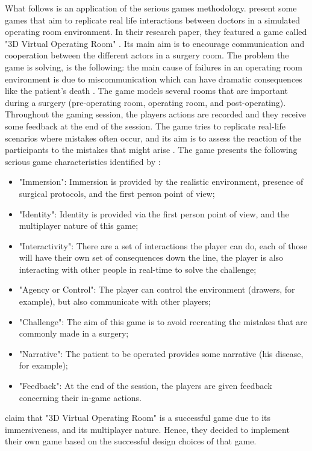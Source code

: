 \documentclass{l4proj}
\begin{document}
What follows is an application of the serious games methodology. \citet{panzoli_interaction_2017} present some games that aim to replicate real life interactions between doctors
in a simulated operating room environment. In their research paper, they featured a game called "3D Virtual Operating Room" \citep{panzoli_interaction_2017}.
Its main aim is to encourage communication and cooperation between the different actors in a surgery room.
The problem the game is solving, is the following: the main cause of failures in an operating room environment is due to miscommunication 
which can have dramatic consequences like the patient's death \citep{panzoli_interaction_2017}. 
The game models several rooms that are important during a surgery (pre-operating room, operating room, and post-operating).
Throughout the gaming session, the players actions are recorded and they receive some feedback at the end of the session.
The game tries to replicate real-life scenarios where mistakes often occur, 
and its aim is to assess the reaction of the participants to the mistakes that might arise \citep{panzoli_interaction_2017}.
The game presents the following serious game characteristics identified by \citet{blumberg_serious_2012}:
\begin{itemize}
    \item "Immersion": Immersion is provided by the realistic environment, presence of surgical protocols, and the first person point of view;
    \item "Identity": Identity is provided via the first person point of view, and the multiplayer nature of this game;
    \item "Interactivity": There are a set of interactions the player can do, each of those will have their own set of consequences down the line, 
    the player is also interacting with other people in real-time to solve the challenge;
    \item "Agency or Control": The player can control the environment (drawers, for example), but also communicate with other players;
    \item "Challenge": The aim of this game is to avoid recreating the mistakes that are commonly made in a surgery;
    \item "Narrative": The patient to be operated provides some narrative (his disease, for example);
    \item "Feedback": At the end of the session, the players are given feedback concerning their in-game actions.
\end{itemize}
\citet{panzoli_interaction_2017} claim that "3D Virtual Operating Room" is a successful game due to its immersiveness, and its multiplayer nature.
Hence, they decided to implement their own game based on the successful design choices of that game.  
\end{document}
